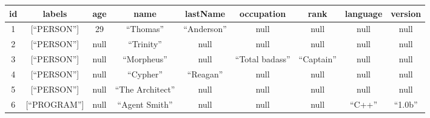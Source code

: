  \begin{table}

 {\footnotesize %

       \begin{center}


       \vspace*{2ex}



\tabcolsep=1.4pt

       \begin{tabular}{|c|c|c|c|c|c|c|c|c|}

       \hline

id&labels&age&name&lastName&occupation&rank&language&version\\

\hline

1&[``PERSON'']&29&``Thomas''&``Anderson''&null&null&null&null\\

2&[``PERSON'']&null&``Trinity''&null&null&null&null&null\\

3&[``PERSON'']&null&``Morpheus''&null&``Total badass''&``Captain''&null&null\\

4&[``PERSON'']&null&``Cypher''&``Reagan''&null&null&null&null\\

5&[``PERSON'']&null&``The Architect''&null&null&null&null&null\\

6&[``PROGRAM'']&null&``Agent Smith''&null&null&null&``C++''&``1.0b''\\

\hline

\end{tabular}

\end{center}}



{\small       \begin{center}


       \vspace*{2ex}




\end{center}}
\end{table}
